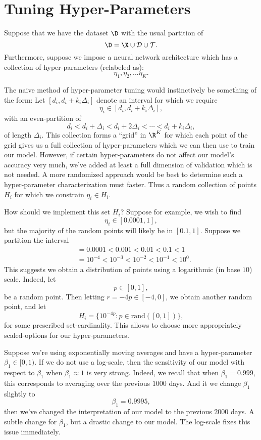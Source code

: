 

\section{Tuning Hyper-Parameters}

Suppose that we have the dataset $\D$ with the usual partition of
$$\D=\X\cup\mathcal{D}\cup\mathcal{T}.$$
Furthermore, suppose we impose a neural network architecture which has a collection of hyper-parameters (relabeled as):
$$\eta_1,\eta_2,...\eta_K.$$

The naive method of hyper-parameter tuning would instinctively be something of the form: Let $[d_i,d_i+k_i\Delta_i]$ denote an interval for which we require
$$\eta_i\in[d_i,d_i+k_i\Delta_i],$$
with an even-partition of 
$$d_i<d_i+\Delta_i<d_i+2\Delta_i<\cdots<d_i+k_i\Delta_i,$$
of length $\Delta_i$.  This collection forms a ``grid'' in $\R^K$ for which each point of the grid gives us a full collection of hyper-parameters which we can then use to train our model.  However, if certain hyper-parameters do not affect our model's accuracy very much, we've added at least a full dimension of validation which is not needed.  A more randomized approach would be best to determine such a hyper-parameter characterization must faster.  Thus a random collection of points $H_i$ for which we constrain $\eta_i\in H_i$.

How should we implement this set $H_i$?  Suppose for example, we wish to find
$$\eta_i\in[0.0001, 1],$$
but the majority of the random points will likely be in $[0.1,1]$.  Suppose we partition the interval
\begin{align*}
	[0.0001,1]&=0.0001<0.001<0.01<0.1<1\\
	&=10^{-4}<10^{-3}<10^{-2}<10^{-1}<10^0.
\end{align*}
This suggests we obtain a distribution of points using a logarithmic (in base $10$) scale.  Indeed, let
$$p\in[0,1],$$
be a random point.  Then letting $r=-4p\in[-4,0]$, we obtain another random point, and let
$$H_i=\{10^{-4p}:p\in\text{rand}([0,1])\},$$
for some prescribed set-cardinality.  This allows to choose more appropriately scaled-options for our hyper-parameters.

\begin{remark}
	Suppose we're using exponentially moving averages and have a hyper-parameter $\beta_1\in[0,1)$.  If we do not use a log-scale, then the sensitivity of our model with respect to $\beta_1$ when $\beta_1\approx 1$ is very strong.  Indeed, we recall that when $\beta_1=0.999$, this corresponds to averaging over the previous $1000$ days.  And it we change $\beta_1$ slightly to
	$$\beta_1=0.9995,$$
	then we've changed the interpretation of our model to the previous $2000$ days.  A subtle change for $\beta_1$, but a drastic change to our model.  The log-scale fixes this issue immediately.
\end{remark}


